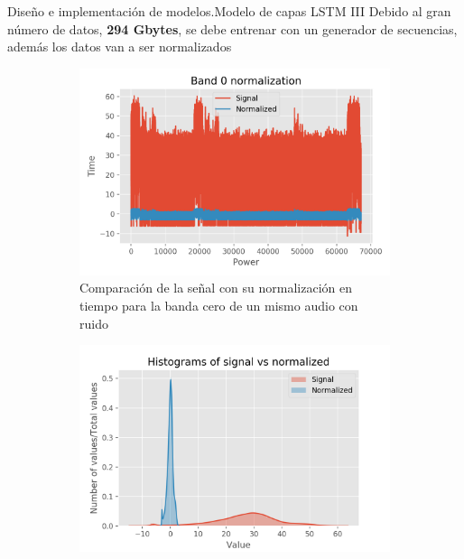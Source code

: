 \begin{frame}[fragile]{Diseño e implementación de modelos.\newline Modelo de capas LSTM III}
	\vspace*{5pt}
	Debido al gran número de datos, \textbf{294 Gbytes}, se debe entrenar con un generador de secuencias, además los datos van a ser normalizados
	\begin{figure}
		\centering
		\begin{subfigure}[t]{0.4\textwidth}
			\centering
			\includegraphics[width=\columnwidth]{../figures/band0_norm}
			\vspace*{-7pt}
			\caption{Comparación de la señal con su normalización en tiempo para la banda cero de un mismo audio con ruido}
			\label{fig: norm_time}
		\end{subfigure}%
		\hspace*{10pt}
		\begin{subfigure}[t]{0.4\textwidth}
			\centering
			\includegraphics[width=\columnwidth]{../figures/band0_norm_hist}

\end{subfigure}
\end{figure}
\end{frame}

